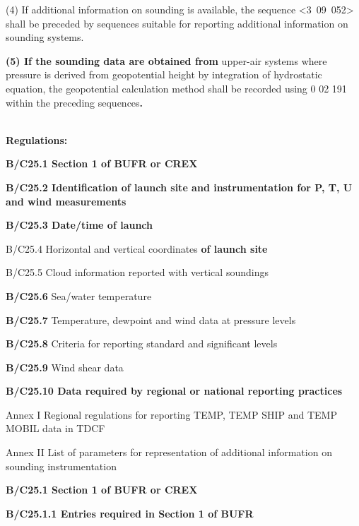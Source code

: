 (4) If additional information on sounding is available, the sequence \textless3~09~052\textgreater{} shall be preceded by sequences suitable for reporting additional information on sounding systems.

\textbf{(5) If the sounding data are obtained from} upper-air systems where pressure is derived from geopotential height by integration of hydrostatic equation, the geopotential calculation method shall be recorded using 0 02 191 within the preceding sequences\textbf{.}

\textbf{\\
Regulations:}

\textbf{B/C25.1 Section 1 of BUFR or CREX}

\textbf{B/C25.2 Identification of launch site and instrumentation for P, T, U and wind measurements}

\textbf{B/C25.3 Date/time of launch}

B/C25.4 Horizontal and vertical coordinates \textbf{of launch site}

B/C25.5 Cloud information reported with vertical soundings

\textbf{B/C25.6} Sea/water temperature

\textbf{B/C25.7} Temperature, dewpoint and wind data at pressure levels

\textbf{B/C25.8} Criteria for reporting standard and significant levels

\textbf{B/C25.9} Wind shear data

\textbf{B/C25.10 Data required by regional or national reporting practices}

Annex I Regional regulations for reporting TEMP, TEMP SHIP and TEMP MOBIL data in TDCF

Annex II List of parameters for representation of additional information on sounding instrumentation

\textbf{B/C25.1 Section 1 of BUFR or CREX}

\textbf{B/C25.1.1 Entries required in Section 1 of BUFR}

